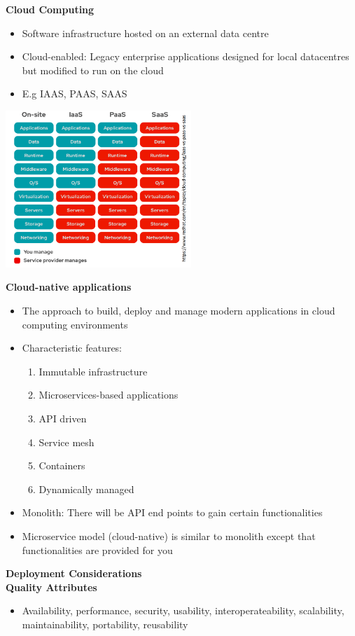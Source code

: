 \documentclass[10pt, landscape]{article}
\begin{document}
\begin{multicols}{4}
\textbf{Cloud Computing}
\begin{itemize}
  \item Software infrastructure hosted on an external data centre 
  \item Cloud-enabled: Legacy enterprise applications designed for local datacentres but modified to run on the cloud 
  \item E.g IAAS, PAAS, SAAS
\end{itemize}
\includegraphics*[width=7cm]{iaas.png}

\textbf{Cloud-native applications}
\begin{itemize}
  \item The approach to build, deploy and manage modern applications in cloud computing environments 
  \item Characteristic features:
   \begin{enumerate}
    \item Immutable infrastructure
    \item Microservices-based applications 
    \item API driven 
    \item Service mesh 
    \item Containers 
    \item Dynamically managed 
  \end{enumerate}
\item Monolith: There will be API end points to gain certain functionalities 
\item Microservice model (cloud-native) is similar to monolith except that functionalities are provided for you
\end{itemize}

\textbf{Deployment Considerations} \\
\textbf{Quality Attributes}
\begin{itemize}
  \item Availability, performance, security, usability, interoperateability, scalability, maintainability, portability, reusability
\end{itemize}


\end{multicols}
\end{document}
